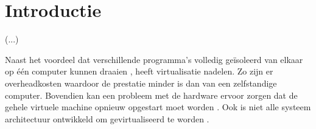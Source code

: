\documentclass[a4paper,12pt]{article}
\begin{document}
\section*{Introductie}
(...)

Naast het voordeel dat verschillende programma's volledig ge\"isoleerd van elkaar op \'e\'en computer kunnen draaien %
, heeft virtualisatie nadelen. Zo zijn er overheadkosten waardoor de prestatie minder is dan van een zelfstandige computer. Bovendien kan een probleem met de hardware ervoor zorgen dat de gehele virtuele machine opnieuw opgestart moet worden .%
Ook is niet alle systeem architectuur ontwikkeld om gevirtualiseerd te worden . %


\											%
\end{document}
